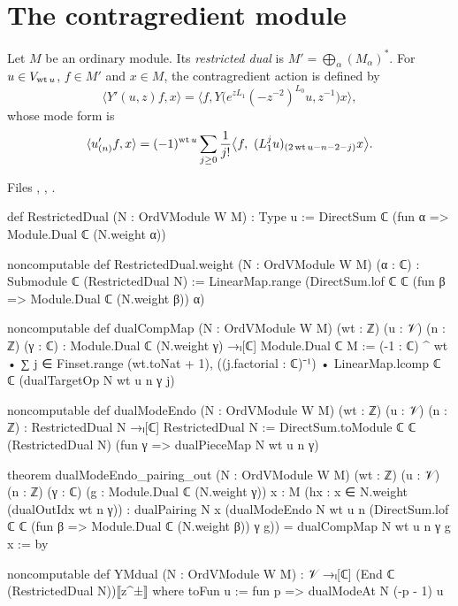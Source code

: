 \section{The contragredient module}\label{l12:sec:contra}

\begin{definition}\label{l12:def:contra}
Let $M$ be an ordinary module. Its \emph{restricted dual} is $M' = \bigoplus_\alpha(M_\alpha)^*$. For $u\in V_{\operatorname{wt} u}$,
$f\in M'$ and $x\in M$, the contragredient action is defined by
\begin{equation*}
 \langle Y'(u,z)f, x\rangle = \big\langle f, Y\big(e^{zL_1}(-z^{-2})^{L_0}u, z^{-1}\big)x\big\rangle ,
\end{equation*}
whose mode form is
\begin{equation*}
 \langle u'_{(n)}f, x\rangle = (-1)^{\wt u}\sum_{j\ge0}\frac1{j!}\big\langle f,\ (L_1^ju)_{(2\wt u-n-2-j)}x\big\rangle .
\end{equation*}
\end{definition}
\noindent Files ,
,
.
\begin{leancode}
def RestrictedDual (N : OrdVModule W M) : Type u := DirectSum ℂ (fun α => Module.Dual ℂ (N.weight α))

noncomputable def RestrictedDual.weight (N : OrdVModule W M) (α : ℂ) :
    Submodule ℂ (RestrictedDual N) :=
  LinearMap.range (DirectSum.lof ℂ ℂ (fun β => Module.Dual ℂ (N.weight β)) α)

noncomputable def dualCompMap (N : OrdVModule W M) (wt : ℤ) (u : 𝒱) (n : ℤ) (γ : ℂ) :
    Module.Dual ℂ (N.weight γ) →ₗ[ℂ] Module.Dual ℂ M :=
  (-1 : ℂ) ^ wt • ∑ j ∈ Finset.range (wt.toNat + 1),
    ((j.factorial : ℂ)⁻¹) • LinearMap.lcomp ℂ ℂ (dualTargetOp N wt u n γ j)

noncomputable def dualModeEndo (N : OrdVModule W M) (wt : ℤ) (u : 𝒱) (n : ℤ) :
    RestrictedDual N →ₗ[ℂ] RestrictedDual N :=
  DirectSum.toModule ℂ ℂ (RestrictedDual N) (fun γ => dualPieceMap N wt u n γ)

theorem dualModeEndo_pairing_out (N : OrdVModule W M) (wt : ℤ) (u : 𝒱) (n : ℤ) (γ : ℂ)
    (g : Module.Dual ℂ (N.weight γ)) {x : M} (hx : x ∈ N.weight (dualOutIdx wt n γ)) :
    dualPairing N x
        (dualModeEndo N wt u n
          (DirectSum.lof ℂ ℂ (fun β => Module.Dual ℂ (N.weight β)) γ g))
      = dualCompMap N wt u n γ g x := by

noncomputable def YMdual (N : OrdVModule W M) : 𝒱 →ₗ[ℂ] (End ℂ (RestrictedDual N))⟦z^±⟧ where
  toFun u := fun p => dualModeAt N (-p - 1) u
\end{leancode}

